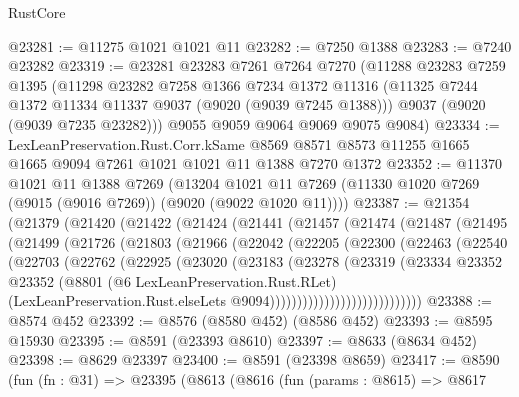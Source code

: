 \begin{lexlean}{RustCore}
\begin{coremodule}
@23281 := @11275 @1021 @1021 @11
@23282 := @7250 @1388
@23283 := @7240 @23282
@23319 := @23281
    @23283
    @7261
    @7264
    @7270
    (@11288
      @23283
      @7259
      @1395
      (@11298
        @23282
        @7258
        @1366
        @7234
        @1372
        @11316
        (@11325 @7244 @1372 @11334 @11337 @9037 (@9020 (@9039 @7245 @1388)))
        @9037
        (@9020 (@9039 @7235 @23282)))
      @9055
      @9059
      @9064
      @9069
      @9075
      @9084)
@23334 := LexLeanPreservation.Rust.Corr.kSame
    @8569
    @8571
    @8573
    @11255
    @1665
    @1665
    @9094
    @7261
    @1021
    @1021
    @11
    @1388
    @7270
    @1372
@23352 := @11370
    @1021
    @11
    @1388
    @7269
    (@13204 @1021 @11 @7269 (@11330 @1020 @7269 (@9015 (@9016 @7269)) (@9020 (@9022 @1020 @11))))
@23387 := @21354
    (@21379
      (@21420
        (@21422
          (@21424
            (@21441
              (@21457
                (@21474
                  (@21487
                    (@21495
                      (@21499
                        (@21726
                          (@21803
                            (@21966
                              (@22042
                                (@22205
                                  (@22300
                                    (@22463
                                      (@22540
                                        (@22703
                                          (@22762
                                            (@22925
                                              (@23020
                                                (@23183
                                                  (@23278
                                                    (@23319
                                                      (@23334
                                                        @23352
                                                        @23352
                                                        (@8801
                                                          (@6 LexLeanPreservation.Rust.RLet)
                                                          (LexLeanPreservation.Rust.elseLets
                                                            @9094))))))))))))))))))))))))))))
@23388 := @8574 @452
@23392 := @8576 (@8580 @452) (@8586 @452)
@23393 := @8595 @15930
@23395 := @8591 (@23393 @8610)
@23397 := @8633 (@8634 @452)
@23398 := @8629 @23397
@23400 := @8591 (@23398 @8659)
@23417 := @8590
    (fun (fn : @31) =>
    @23395
      (@8613
        (@8616
          (fun (params : @8615) =>
          @8617

\end{coremodule}
\end{lexlean}

